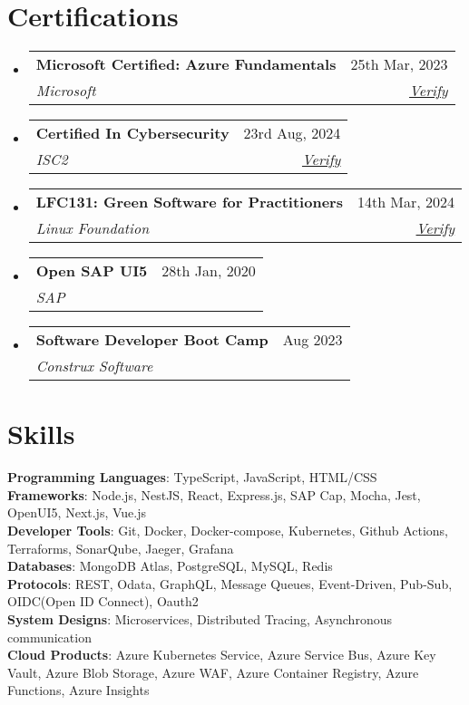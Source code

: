 \documentclass[letterpaper,11pt]{article}
\makeatletter
\newcommand{\resumeSubheading}[4]{
  \vspace{-2pt}\item
    \begin{tabular*}{0.97\textwidth}[t]{l@{\extracolsep{\fill}}r}
      \textbf{#1} & #2 \\
      \textit{\small#3} & \textit{\small #4} \\
    \end{tabular*}\vspace{-7pt}
}
\newcommand{\resumeSubHeadingListStart}{\begin{itemize}[leftmargin=0.15in, label={}]}
\newcommand{\resumeSubHeadingListEnd}{\end{itemize}}
\makeatother
\begin{document}
\section{Certifications}
  \resumeSubHeadingListStart
    \resumeSubheading
      {Microsoft Certified: Azure Fundamentals}{25th Mar, 2023}
      {Microsoft}{\href{https://www.credly.com/badges/aa9c3ec7-8e5d-4e0f-bd37-19fb382603f8/linked_in_profile}{\underline{Verify}}}

     \resumeSubheading
      {Certified In Cybersecurity}{23rd Aug, 2024}
      {ISC2}{\href{https://www.credly.com/badges/ffbfd08f-225c-435c-aac2-856c6e5c82b7/public_url}{\underline{Verify}}}

    \resumeSubheading
      {LFC131: Green Software for Practitioners}{14th Mar, 2024}
      {Linux Foundation}{\href{https://www.credly.com/badges/92e3361f-275d-44db-9bfd-1c926ea53289/public_url}{\underline{Verify}}}

    \resumeSubheading
      {Open SAP UI5}{28th Jan, 2020}
      {SAP}{}

    \resumeSubheading
      {Software Developer Boot Camp}{Aug 2023}
      {Construx Software}{}
  \resumeSubHeadingListEnd

  
\section{Skills}
 \begin{itemize}[leftmargin=0.15in, label={}]
    \small{\item{
     \textbf{Programming Languages}{: TypeScript, JavaScript, HTML/CSS} \\
     \textbf{Frameworks}{: Node.js, NestJS, React, Express.js, SAP Cap, Mocha, Jest, OpenUI5, Next.js, Vue.js } \\
     \textbf{Developer Tools}{: Git, Docker, Docker-compose, Kubernetes, Github Actions, Terraforms, SonarQube, Jaeger, Grafana} \\
     \textbf{Databases}{: MongoDB Atlas, PostgreSQL, MySQL, Redis} \\
     \textbf{Protocols}{: REST, Odata, GraphQL, Message Queues, Event-Driven, Pub-Sub, OIDC(Open ID Connect), Oauth2} \\
     \textbf{System Designs}{: Microservices, Distributed Tracing, Asynchronous communication} \\
     \textbf{Cloud Products}{: Azure Kubernetes Service, Azure Service Bus, Azure Key Vault, Azure Blob Storage, Azure WAF, Azure Container Registry, Azure Functions, Azure Insights }
    }}
 \end{itemize}


\end{document}
